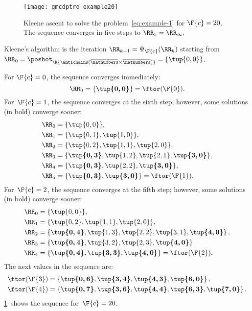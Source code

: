 \begin{figure}
    \begin{centering}
        \texttt{[image: gmcdptro\_example20]}
    \end{centering}
    \caption{\label{fig:example24}Kleene ascent to solve the problem~\cref{eq:example-1}
    for $\F{c}=20$. The sequence converges in five steps to $\RR_{5}=\RR_{\infty}.$ }
\end{figure}

\noindent Kleene's algorithm is the iteration $\RR_{k+1}=\Psi_{\F{c}}(\RR_{k})$
starting from $\RR_{0}=\posbot_{\R{\antichains(\overline{\natnumbers}\times\overline{\natnumbers})}}=\{\tup{ 0,0} \}$.

\noindent For $\F{c}=0$, the sequence converges immediately:
\begin{equation*}
    \RR_{0}=\{\boldsymbol{\tup{ 0,0} }\}=\ftor(\F{0}).
\end{equation*}
For~$\F{c}=1$, the sequence converges at the sixth step; however, some solutions (in bold) converge sooner:
\begin{align*}
    \RR_{0} & =\{\tup{0,0} \},\\
    \RR_{1} & =\{\tup{0,1},\tup{1,0}\},\\
    \RR_{2} & =\{\tup{0,2},\tup{1,1}, \tup{2,0}\},\\
    \RR_{3} & =\{\boldsymbol{\tup{0,3}},\tup{1,2}, \tup{2,1},\boldsymbol{\tup{3,0}}\},\\
    \RR_{4} & =\{\boldsymbol{\tup{0,3}},\tup{2,2},\boldsymbol{\tup{3,0}}\},\\
    \RR_{5} & =\{\boldsymbol{\tup{0,3}},\boldsymbol{\tup{3,0}}\}=\ftor(\F{1}).
\end{align*}
For~$\F{c}=2$, the sequence converges at the fifth step; however,
some solutions (in bold) converge sooner:
\begin{align*}
    \RR_{0} & =\{\tup{ 0,0} \},\\
    \RR_{1} & =\{\tup{ 0,2} ,\tup{ 1,1} ,\tup{ 2,0} \},\\
    \RR_{2} & =\left\{ \boldsymbol{\tup{ 0,4} }, \tup{1,3}, \tup{2,2}, \tup{3,1}, \boldsymbol{\tup{ 4,0} }\right\} ,\\
    \RR_{3} & =\{\boldsymbol{\tup{0,4} },\tup{ 3,2}, \tup{2,3}, \boldsymbol{\tup{ 4,0} }\}\\
    \RR_{4} & =\{\boldsymbol{\tup{0,4} },\boldsymbol{\tup{ 3,3}},\boldsymbol{\tup{ 4,0} }\}=\ftor(\F{2}).
\end{align*}
The next values in the sequence are:
\begin{align*}
    \ftor(\F{3}) & =\left\{ \boldsymbol{\tup{ 0,6} },\boldsymbol{\tup{ 3,4} },\boldsymbol{\tup{ 4,3} },\boldsymbol{\tup{ 6,0} }\right\} ,\\
    \ftor(\F{4}) & =\left\{ \boldsymbol{\tup{ 0,7} },\boldsymbol{\tup{ 3,6} },\boldsymbol{\tup{ 4,4} },\boldsymbol{\tup{ 6,3} },\boldsymbol{\tup{ 7,0} }\right\} .
\end{align*}
\cref{fig:example24}~shows the sequence for~$\F{c}=20$.

